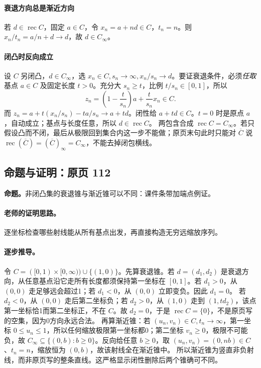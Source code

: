 \documentclass[11pt,a4paper]{article}
\theoremstyle{definition}\newtheorem{definition}{定义}\newtheorem{example}{例}
\begin{document}
\paragraph{衰退方向总是渐近方向}
若 $d\in\operatorname{rec}C$，固定 $a\in C$，令 $x_n=a+nd\in C$，$t_n=n$。则 $x_n/t_n=a/n+d\to d$，故 $d\in C_\infty$。
\paragraph{闭凸时反向成立}
设 $C$ 另闭凸，$d\in C_\infty$，选 $x_n\in C,s_n\to\infty,x_n/s_n\to d$。要证衰退条件，必须\emph{任取}基点 $a\in C$ 及固定长度 $t>0$。充分大 $s_n\ge t$，比例 $t/s_n\in[0,1]$，所以
\[z_n=\left(1-\frac t{s_n}\right)a+\frac t{s_n}x_n\in C.\]
而 $z_n=a+t(x_n/s_n)-ta/s_n\to a+td$。闭性给 $a+td\in C$。$t=0$ 时是原点 $a$，自动成立；基点与长度任意，所以 $d\in\operatorname{rec}C$。
两包含合成 $\operatorname{rec}C=C_\infty$。若只假设凸而不闭，最后从极限回到集合内这一步不能做；原页末句此时只能对 $\overline C$ 说 $\operatorname{rec}(\overline C)=(\overline C)_\infty=C_\infty$，不能去掉闭包横线。


\subsection{命题与证明：原页 112}

\textbf{命题。}非闭凸集的衰退锥与渐近锥可以不同：课件条带加端点例证。

\paragraph{老师的证明思路。}逐坐标检查哪些射线能从所有基点出发，再直接构造无穷远缩放序列。

\paragraph{逐步推导。}
令 $C=([0,1)\times[0,\infty))\cup\{(1,0)\}$。先算衰退锥。若 $d=(d_1,d_2)$ 是衰退方向，从任意基点沿它走所有长度都须保持第一坐标在 $[0,1]$。若 $d_1>0$，从 $(0,0)$ 走足够远会超过1；若 $d_1<0$，从 $(0,0)$ 立即变负。因此 $d_1=0$。
若 $d_2<0$，从 $(0,0)$ 走后第二坐标负；若 $d_2>0$，从 $(1,0)$ 走到 $(1,td_2)$，该点第一坐标恰1而第二坐标正，不在 $C$。故 $d_2=0$，于是 $\operatorname{rec}C=\{0\}$，不是原页写的空集，因为0方向永远合法。
再算渐近锥：若 $(u_n,v_n)\in C,t_n\to\infty$，第一坐标 $0\le u_n\le1$，所以任何缩放极限第一坐标都0；第二坐标 $v_n\ge0$，极限不可能负，故 $C_\infty\subseteq\{(0,b):b\ge0\}$。反向给任意 $b\ge0$，取 $(u_n,v_n)=(0,nb)\in C$、$t_n=n$，缩放恒为 $(0,b)$，故该射线全在渐近锥中。
所以渐近锥为竖直非负射线，而非原页写的整条直线。这严格显示闭性删除后两个锥确可不同。
\end{document}
